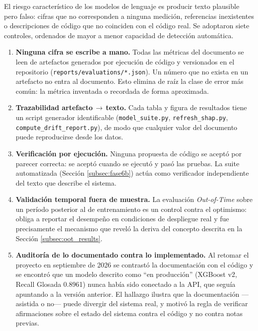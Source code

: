 \documentclass[12pt,letterpaper]{report}
\newcommand{\idb}{\discretionary{}{}{}}
\begin{document}
El riesgo característico de los modelos de lenguaje es producir texto plausible pero
falso: cifras que no corresponden a ninguna medición, referencias inexistentes o
descripciones de código que no coinciden con el código real. Se adoptaron siete
controles, ordenados de mayor a menor capacidad de detección automática.

\begin{enumerate}
    \item \textbf{Ninguna cifra se escribe a mano.} Todas las métricas del documento se
    leen de artefactos generados por ejecución de código y versionados en el
    repositorio (\texttt{reports/evaluations/*.json}). Un número que no exista en un
    artefacto no entra al documento. Esto elimina de raíz la clase de error más común:
    la métrica inventada o recordada de forma aproximada.

    \item \textbf{Trazabilidad artefacto\,$\rightarrow$\,texto.} Cada tabla y figura de
    resultados tiene un script generador identificable (\texttt{model\_suite.py},
    \texttt{refresh\_shap.py}, \texttt{compute\_drift\_\idb report.py}), de modo que
    cualquier valor del documento puede reproducirse desde los datos.

    \item \textbf{Verificación por ejecución.} Ninguna propuesta de código se aceptó por
    parecer correcta: se aceptó cuando se ejecutó y pasó las pruebas. La suite
    automatizada (Sección \ref{subsec:fase6b}) actúa como verificador independiente del
    texto que describe el sistema.

    \item \textbf{Validación temporal fuera de muestra.} La evaluación
    \textit{Out-of-Time} sobre un período posterior al de entrenamiento es un control
    contra el optimismo: obliga a reportar el desempeño en condiciones de despliegue
    real y fue precisamente el mecanismo que reveló la deriva del concepto descrita en
    la Sección \ref{subsec:oot_results}.

    \item \textbf{Auditoría de lo documentado contra lo implementado.} Al retomar el
    proyecto en septiembre de 2026 se contrastó la documentación con el código y se
    encontró que un modelo descrito como ``en producción'' (XGBoost v2, Recall Glosada
    0.8961) nunca había sido conectado a la API, que seguía apuntando a la versión
    anterior. El hallazgo ilustra que la documentación —asistida o no— puede divergir
    del sistema real, y motivó la regla de verificar afirmaciones sobre el estado del
    sistema contra el código y no contra notas previas.


\end{enumerate}
\end{document}
